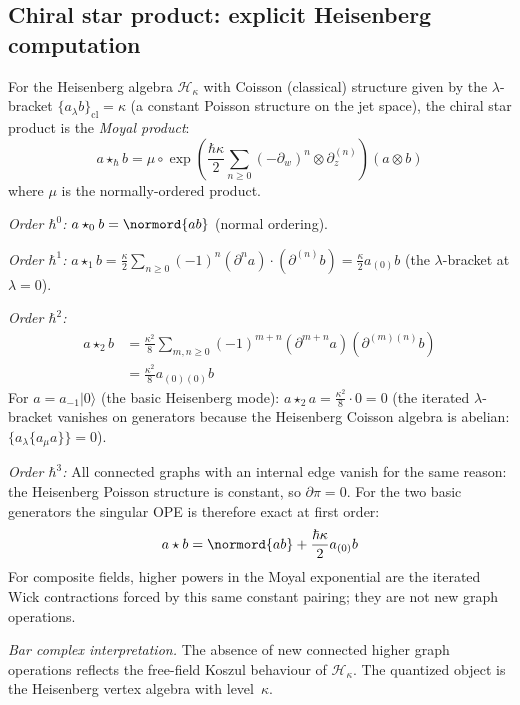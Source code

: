 \subsection{Chiral star product: explicit Heisenberg computation}

\begin{computation}
\label{comp:heisenberg-star-product}

For the Heisenberg algebra $\mathcal{H}_\kappa$ with Coisson
(classical) structure given by the $\lambda$-bracket
$\{a_\lambda b\}_{\mathrm{cl}} = \kappa$ (a constant Poisson
structure on the jet space), the chiral star product is the
\emph{Moyal product}:
\begin{equation}\label{eq:heisenberg-moyal}
a \star_\hbar b = \mu \circ \exp\left(
\frac{\hbar \kappa}{2}
\sum_{n \geq 0} (-\partial_w)^n \otimes \partial_z^{(n)}
\right)(a \otimes b)
\end{equation}
where $\mu$ is the normally-ordered product.

\emph{Order $\hbar^0$:} $a \star_0 b = \normord{ab}$
(normal ordering).

\emph{Order $\hbar^1$:} $a \star_1 b = \frac{\kappa}{2}
\sum_{n \geq 0} (-1)^n (\partial^n a) \cdot
(\partial^{(n)} b) = \frac{\kappa}{2} a_{(0)}b$ (the
$\lambda$-bracket at $\lambda = 0$).

\emph{Order $\hbar^2$:}
\begin{align*}
a \star_2 b &= \frac{\kappa^2}{8}
\sum_{m,n \geq 0} (-1)^{m+n}
(\partial^{m+n} a)(\partial^{(m)(n)} b) \\
&= \frac{\kappa^2}{8} a_{(0)(0)}b
\end{align*}
For $a = a_{-1}|0\rangle$ (the basic Heisenberg mode):
$a \star_2 a = \frac{\kappa^2}{8} \cdot 0 = 0$ (the iterated
$\lambda$-bracket vanishes on generators because the Heisenberg
Coisson algebra is abelian: $\{a_\lambda\{a_\mu a\}\} = 0$).

\emph{Order $\hbar^3$:}
All connected graphs with an internal edge vanish for the same reason:
the Heisenberg Poisson structure is constant, so $\partial\pi=0$.
For the two basic generators the singular OPE is therefore exact at
first order:
\begin{equation}\label{eq:heisenberg-exact}
a \star b = \normord{ab} + \frac{\hbar\kappa}{2} a_{(0)}b
\end{equation}
For composite fields, higher powers in the Moyal exponential are the
iterated Wick contractions forced by this same constant pairing; they
are not new graph operations.

\emph{Bar complex interpretation.}
The absence of new connected higher graph operations reflects the
free-field Koszul behaviour of $\mathcal{H}_\kappa$. The quantized
object is the Heisenberg vertex algebra with level~$\kappa$.
\end{computation}

